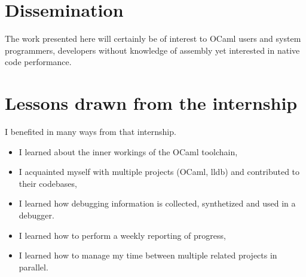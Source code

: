 \section{Dissemination\label{sec:dissemination}}

The work presented here will certainly be of interest to OCaml users and system
programmers, developers without knowledge of assembly yet interested in native
code performance.











\section{Lessons drawn from the internship}

I benefited in many ways from that internship.\\
\begin{itemize}
    \item I learned about the inner workings of the OCaml toolchain,
    \item I acquainted myself with multiple projects (OCaml, lldb) and contributed to their codebases,
    \item I learned how debugging information is collected, synthetized and used
        in a debugger.
    \item I learned how to perform a weekly reporting of progress,
    \item I learned how to manage my time between multiple related projects in
        parallel.
\end{itemize}
